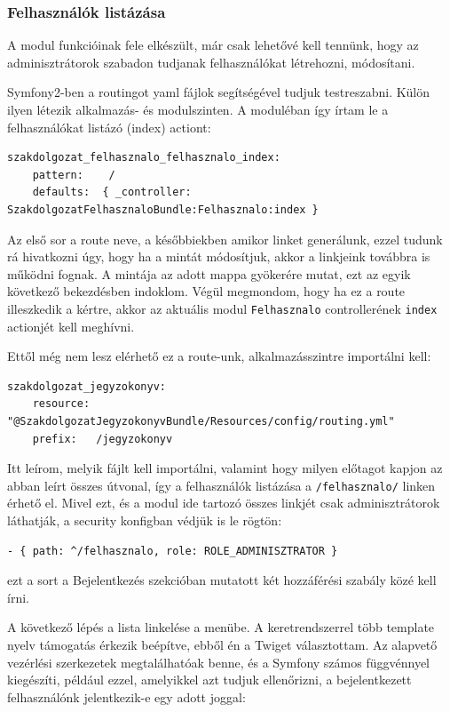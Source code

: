 \documentclass[a4paper,12pt,oneside]{report}
\begin{document}
\subsubsection*{Felhasználók listázása}

A modul funkcióinak fele elkészült, már csak lehetővé kell tennünk, hogy az adminisztrátorok szabadon tudjanak felhasználókat létrehozni, módosítani.

Symfony2-ben a routingot yaml fájlok segítségével tudjuk testreszabni. Külön ilyen létezik alkalmazás- és modulszinten. A moduléban így írtam le a felhasználókat listázó (index) actiont:

\begin{lstlisting}
szakdolgozat_felhasznalo_felhasznalo_index:
    pattern:    /
    defaults:  { _controller: SzakdolgozatFelhasznaloBundle:Felhasznalo:index }
\end{lstlisting}

Az első sor a route neve, a későbbiekben amikor linket generálunk, ezzel tudunk rá hivatkozni úgy, hogy ha a mintát módosítjuk, akkor a linkjeink továbbra is működni fognak. A mintája az adott mappa gyökerére mutat, ezt az egyik következő bekezdésben indoklom. Végül megmondom, hogy ha ez a route illeszkedik a kértre, akkor az aktuális modul {\tt Felhasznalo} controllerének {\tt index} actionjét kell meghívni.

Ettől még nem lesz elérhető ez a route-unk, alkalmazásszintre importálni kell:

\begin{lstlisting}
szakdolgozat_jegyzokonyv:
    resource: "@SzakdolgozatJegyzokonyvBundle/Resources/config/routing.yml"
    prefix:   /jegyzokonyv
\end{lstlisting}

Itt leírom, melyik fájlt kell importálni, valamint hogy milyen előtagot kapjon az abban leírt összes útvonal, így a felhasználók listázása a {\tt /felhasznalo/} linken érhető el. Mivel ezt, és a modul ide tartozó összes linkjét csak adminisztrátorok láthatják, a security konfigban védjük is le rögtön:

\begin{lstlisting}
- { path: ^/felhasznalo, role: ROLE_ADMINISZTRATOR }
\end{lstlisting}

ezt a sort a Bejelentkezés szekcióban mutatott két hozzáférési szabály közé kell írni.

A következő lépés a lista linkelése a menübe. A keretrendszerrel több template nyelv támogatás érkezik beépítve, ebből én a Twiget\cite{website:twig} választottam. Az alapvető vezérlési szerkezetek megtalálhatóak benne, és a Symfony számos függvénnyel kiegészíti, például ezzel, amelyikkel azt tudjuk ellenőrizni, a bejelentkezett felhasználónk jelentkezik-e egy adott joggal:
\end{document}
